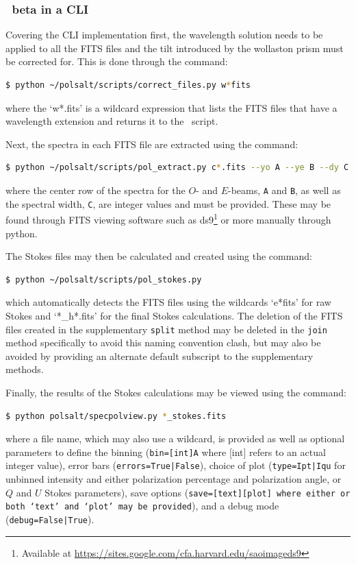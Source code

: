 \subsubsection{\polsalt\ beta in a \gls{CLI}}

Covering the \gls{CLI} implementation first, the wavelength solution needs to be applied to all the \gls{FITS} files and the tilt introduced by the wollaston prism must be corrected for. This is done through the command:
\begin{lstlisting}[language=bash]
$ python ~/polsalt/scripts/correct_files.py w*fits
\end{lstlisting}
{\parskip=0pt
where the `w*.fits' is a wildcard expression that lists the \gls{FITS} files that have a wavelength extension and returns it to the \polsalt\ script.
}

Next, the spectra in each \gls{FITS} file are extracted using the command:
\begin{lstlisting}[language=bash]
$ python ~/polsalt/scripts/pol_extract.py c*.fits --yo A --ye B --dy C
\end{lstlisting}
{\parskip=0pt
where the center row of the spectra for the $O$- and $E$-beams, \texttt{A} and \texttt{B}, as well as the spectral width, \texttt{C}, are integer values and must be provided. These may be found through \gls{FITS} viewing software such as ds9\footnote{Available at \protect\url{https://sites.google.com/cfa.harvard.edu/saoimageds9}} or more manually through python.
}

The Stokes files may then be calculated and created using the command:
\begin{lstlisting}[language=bash]
$ python ~/polsalt/scripts/pol_stokes.py
\end{lstlisting}
{\parskip=0pt
which automatically detects the \gls{FITS} files using the wildcards `e*fits' for raw Stokes and `*\_h*.fits' for the final Stokes calculations. The deletion of the \gls{FITS} files created in the supplementary \texttt{split} method may be deleted in the \texttt{join} method specifically to avoid this naming convention clash, but may also be avoided by providing an alternate default subscript to the supplementary methods.
}

Finally, the results of the Stokes calculations may be viewed using the command:
\begin{lstlisting}[language=bash]
$ python polsalt/specpolview.py *_stokes.fits
\end{lstlisting}
{\parskip=0pt
where a file name, which may also use a wildcard, is provided as well as optional para\-meters to define the binning (\texttt{bin=[int]A} where [int] refers to an actual integer value), error bars (\texttt{errors=True|False}), choice of plot (\texttt{type=Ipt|Iqu} for unbinned intensity and either polarization percentage and polarization angle, or $Q$ and $U$ Stokes parameters), save options (\texttt{save=[text][plot] where either or both `text' and `plot' may be provided}), and a debug mode (\texttt{debug=False|True}).
}

